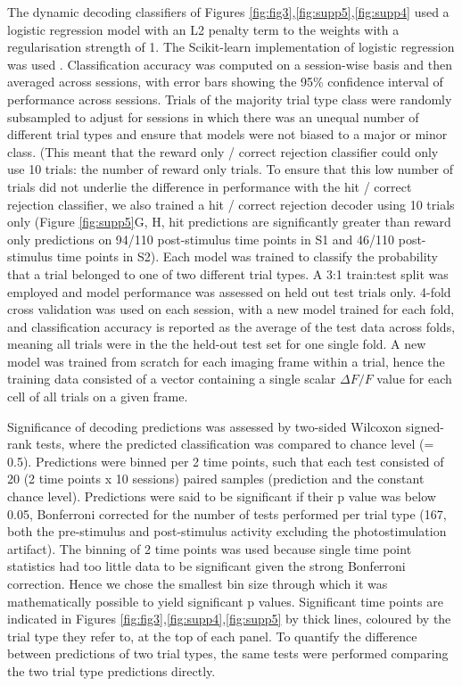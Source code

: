 The dynamic decoding classifiers of Figures \ref{fig:fig3},\ref{fig:supp5},\ref{fig:supp4} used a logistic regression model with an L2 penalty term to the weights with a regularisation strength of 1. The Scikit-learn implementation of logistic regression was used \cite{pedregosa_scikit-learn_2012}. Classification accuracy was computed on a session-wise basis and then averaged across sessions, with error bars showing the 95\% confidence interval of performance across sessions. Trials of the majority trial type class were randomly subsampled to adjust for sessions in which there was an unequal number of different trial types and ensure that models were not biased to a major or minor class. (This meant that the reward only / correct rejection classifier could only use 10 trials: the number of reward only trials. To ensure that this low number of trials did not underlie the difference in performance with the hit / correct rejection classifier, we also trained a hit / correct rejection decoder using 10 trials only (Figure \ref{fig:supp5}G, H, hit predictions are significantly greater than reward only predictions on 94/110 post-stimulus time points in S1 and 46/110 post-stimulus time points in S2). Each model was trained to classify the probability that a trial belonged to one of two different trial types. A 3:1 train:test split was employed and model performance was assessed on held out test trials only. 4-fold cross validation was used on each session, with a new model trained for each fold, and classification accuracy is reported as the average of the test data across folds, meaning all trials were in the the held-out test set for one single fold. A new model was trained from scratch for each imaging frame within a trial, hence the training data consisted of a vector containing a single scalar $\Delta F/F$ value for each cell of all trials on a given frame.

Significance of decoding predictions was assessed by two-sided Wilcoxon signed-rank tests, where the predicted classification was compared to chance level (= 0.5). Predictions were binned per 2 time points, such that each test consisted of 20 (2 time points x 10 sessions) paired samples (prediction and the constant chance level). Predictions were said to be significant if their p value was below 0.05, Bonferroni corrected for the number of tests performed per trial type (167, both the pre-stimulus and post-stimulus activity excluding the photostimulation artifact). The binning of 2 time points was used because single time point statistics had too little data to be significant given the strong Bonferroni correction. Hence we chose the smallest bin size through which it was mathematically possible to yield significant p values. Significant time points are indicated in Figures \ref{fig:fig3},\ref{fig:supp4},\ref{fig:supp5} by thick lines, coloured by the trial type they refer to, at the top of each panel. To quantify the difference between predictions of two trial types, the same tests were performed comparing the two trial type predictions directly.


